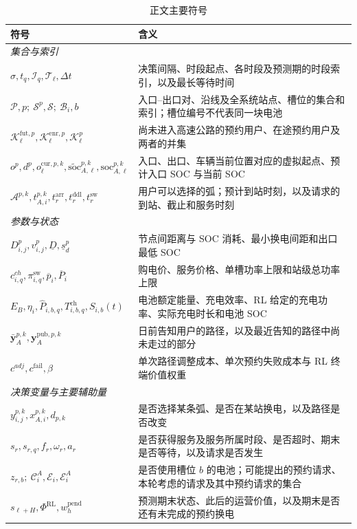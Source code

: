 \documentclass[12pt,a4paper,UTF8]{ctexart}
\begin{document}
\begin{table}[!ht]
  \centering
  \caption{正文主要符号}
  \label{tab:notation}
  \small
  \setlength{\tabcolsep}{3pt}
  \renewcommand{\arraystretch}{0.98}
  \begin{tabular}{@{}lp{11cm}@{}}
    \toprule
    \textbf{符号} & \textbf{含义} \\
    \midrule
    \multicolumn{2}{l}{\textit{集合与索引}} \\
    $\sigma,t_q,\mathcal I_q,\mathcal T_\ell,\Delta t$ & 决策间隔、时段起点、各时段及预测期的时段索引，以及最长等待时间 \\
    $\mathcal P,p;\ \mathcal S^p,\mathcal S;\ \mathcal B_i,b$ & 入口--出口对、沿线及全系统站点、槽位的集合和索引；槽位编号不代表同一块电池 \\
    $\mathcal K_\ell^{\mathrm{fut},p},\mathcal K_\ell^{\mathrm{enr},p},\mathcal K_\ell^p$ & 尚未进入高速公路的预约用户、在途预约用户及两者的并集 \\
    $o^p,d^p,o_\ell^{\mathrm{cur},p,k},\widetilde{\mathrm{soc}}_{A,\ell}^{p,k},\mathrm{soc}_{A,\ell}^{p,k}$ & 入口、出口、车辆当前位置对应的虚拟起点、预计入口 SOC 与当前 SOC \\
    $\mathcal A^{p,k},t_{A,i}^{p,k},t_r^{\mathrm{arr}},t_r^{\mathrm{ddl}},t_r^{\mathrm{sw}}$ & 用户可以选择的弧；预计到站时刻，以及请求的到站、截止和服务时刻 \\
    \midrule
    \multicolumn{2}{l}{\textit{参数与状态}} \\
    $D_{i,j}^{p},v_{i,j}^{p},\underline D,\underline s_d^p$ & 节点间距离与 SOC 消耗、最小换电间距和出口最低 SOC \\
    $c^{ch}_{i,q},\pi_{i,q}^{\mathrm{sw}},\overline p_i,\overline P_i$ & 购电价、服务价格、单槽功率上限和站级总功率上限 \\
    $E_B,\eta_i,\widehat P_{i,b,q},T_{i,b,q}^{\mathrm{ch}},S_{i,b}(t)$ & 电池额定能量、充电效率、RL 给定的充电功率、实际充电时长和电池 SOC \\
    $\bar{\mathbf y}_{A}^{p,k},\mathbf y_{A}^{\mathrm{pub},p,k}$ & 日前告知用户的路径，以及最近告知的路径中尚未走过的部分 \\
    $c^{adj},c^{\mathrm{fail}},\beta$ & 单次路径调整成本、单次预约失败成本与 RL 终端价值权重 \\
    \midrule
    \multicolumn{2}{l}{\textit{决策变量与主要辅助量}} \\
    $y_{i,j}^{p,k},x_{A,i}^{p,k},d_{p,k}$ & 是否选择某条弧、是否在某站换电，以及路径是否改变 \\
    $s_r,s_{r,q},f_r,\omega_r,a_r$ & 是否获得服务及服务所属时段、是否超时、期末是否等待，以及请求是否发生 \\
    $z_{r,b};\ \mathcal C_i^A,\mathcal E_i,\mathcal E_i^A$ & 是否使用槽位 $b$ 的电池；可能提出的预约请求、本轮考虑的请求及其中预约请求的集合 \\
    $s_{\ell+H},\Phi^{\mathrm{RL}},w_h^{\mathrm{pend}}$ & 预测期末状态、此后的运营价值，以及期末是否还有未完成的预约换电 \\
    \bottomrule
  \end{tabular}
\end{table}
\end{document}
